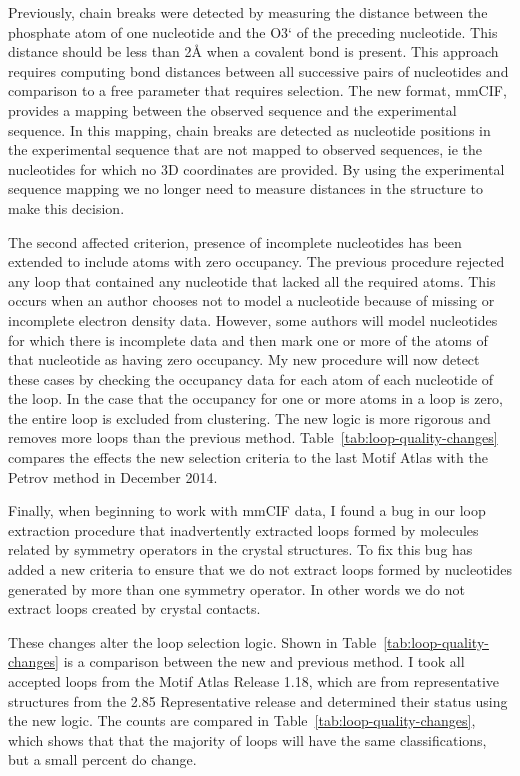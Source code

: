 Previously, chain breaks were detected by measuring the distance between the
phosphate atom of one nucleotide and the O3` of the preceding nucleotide. This
distance should be less than 2{\AA} \cite{Petrov2012} when a covalent bond is
present. This approach requires computing bond distances between all successive
pairs of nucleotides and comparison to a free parameter that requires selection.
The new format, mmCIF, provides a mapping between the observed sequence and the
experimental sequence. In this mapping, chain breaks are detected as nucleotide
positions in the experimental sequence that are not mapped to observed
sequences, ie the nucleotides for which no 3D coordinates are provided. By
using the experimental sequence mapping we no longer need to measure distances
in the structure to make this decision.

The second affected criterion, presence of incomplete nucleotides has been
extended to include atoms with zero occupancy. The previous procedure rejected
any loop that contained any nucleotide that lacked all the required atoms. This
occurs when an author chooses not to model a nucleotide because of missing  or
incomplete electron density data. However, some authors will model nucleotides
for which there is incomplete data and then mark one or more of the atoms of
that nucleotide as having zero occupancy. My new procedure will now
detect these cases by checking the occupancy data for each atom of each
nucleotide of the loop. In the case that the occupancy for one or more atoms in
a loop is zero, the entire loop is excluded from clustering. The new logic is
more rigorous and removes more loops than the previous method.
Table~\ref{tab:loop-quality-changes} compares the effects the new selection
criteria to the last Motif Atlas with the Petrov method in December 2014.

Finally, when beginning to work with mmCIF data, I found a bug in our loop
extraction procedure that inadvertently extracted loops formed by molecules
related by symmetry operators in the crystal structures. To fix this bug has
added a new criteria to ensure that we do not extract loops formed by
nucleotides generated by more than one symmetry operator.  In other words
we do not extract loops created by crystal contacts.

These changes alter the loop selection logic. Shown in
Table~\ref{tab:loop-quality-changes} is a comparison between the new and
previous method. I took all accepted loops from the Motif Atlas Release 1.18,
which are from representative structures from the 2.85 Representative release
and determined their status using the new logic. The counts are compared in
Table~\ref{tab:loop-quality-changes}, which shows that that the majority of
loops will have the same classifications, but a small percent do change.

